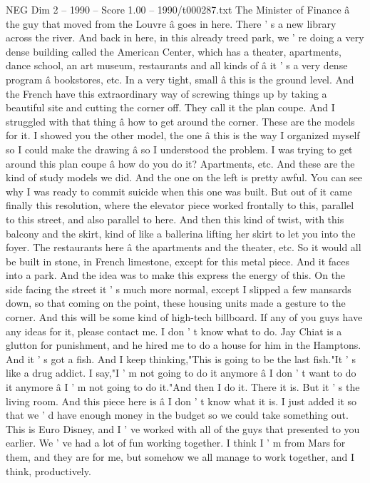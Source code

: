 \begin{textsample}{NEG Dim 2 – 1990 – Score 1.00 – 1990/t000287.txt}
The Minister of Finance â the guy that moved from the Louvre â goes in here.
There ' s a new library across the river.
And back in here, in this already treed park, we ' re doing a very dense building called the American Center, which has a theater, apartments, dance school, an art museum, restaurants and all kinds of â it ' s a very dense program â bookstores, etc.
In a very tight, small â this is the ground level.
And the French have this extraordinary way of screwing things up by taking a beautiful site and cutting the corner off.
They call it the plan coupe.
And I struggled with that thing â how to get around the corner.
These are the models for it.
I showed you the other model, the one â this is the way I organized myself so I could make the drawing â so I understood the problem.
I was trying to get around this plan coupe â how do you do it?
Apartments, etc.
And these are the kind of study models we did.
And the one on the left is pretty awful.
You can see why I was ready to commit suicide when this one was built.
But out of it came finally this resolution, where the elevator piece worked frontally to this, parallel to this street, and also parallel to here.
And then this kind of twist, with this balcony and the skirt, kind of like a ballerina lifting her skirt to let you into the foyer.
The restaurants here â the apartments and the theater, etc.
So it would all be built in stone, in French limestone, except for this metal piece.
And it faces into a park.
And the idea was to make this express the energy of this.
On the side facing the street it ' s much more normal, except I slipped a few mansards down, so that coming on the point, these housing units made a gesture to the corner.
And this will be some kind of high-tech billboard.
If any of you guys have any ideas for it, please contact me.
I don ' t know what to do.
Jay Chiat is a glutton for punishment, and he hired me to do a house for him in the Hamptons.
And it ' s got a fish.
And I keep thinking,"This is going to be the last fish."It ' s like a drug addict.
I say,"I ' m not going to do it anymore â I don ' t want to do it anymore â I ' m not going to do it."And then I do it.
There it is.
But it ' s the living room.
And this piece here is â I don ' t know what it is.
I just added it so that we ' d have enough money in the budget so we could take something out.
This is Euro Disney, and I ' ve worked with all of the guys that presented to you earlier.
We ' ve had a lot of fun working together.
I think I ' m from Mars for them, and they are for me, but somehow we all manage to work together, and I think, productively.

\end{textsample}

